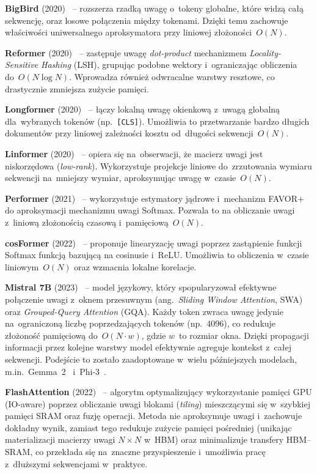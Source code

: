 \documentclass[a4paper,11pt,twoside]{report}
\theoremstyle{definition}
\begin{document}
\textbf{BigBird} (2020)~\cite{zaheer2020big} -- rozszerza rzadką uwagę o~tokeny globalne, które widzą całą sekwencję, oraz losowe połączenia między tokenami. Dzięki temu zachowuje właściwości uniwersalnego aproksymatora przy liniowej złożoności~$O(N)$.

\textbf{Reformer} (2020)~\cite{Kitaev2020Reformer:} -- zastępuje uwagę \textit{dot-product} mechanizmem \textit{Locality-Sensitive Hashing} (LSH), grupując podobne wektory i~ograniczając obliczenia do~$O(N \log N)$. Wprowadza również odwracalne warstwy resztowe, co drastycznie zmniejsza zużycie pamięci.

\textbf{Longformer} (2020)~\cite{beltagy2020longformer} -- łączy lokalną uwagę okienkową z~uwagą globalną dla~wybranych tokenów (np.\ \texttt{[CLS]}). Umożliwia to przetwarzanie bardzo długich dokumentów przy liniowej zależności kosztu od~długości sekwencji~$O(N)$.

\textbf{Linformer} (2020)~\cite{wang2020linformer} -- opiera się na~obserwacji, że macierz uwagi jest niskorzędowa (\textit{low-rank}). Wykorzystuje projekcje liniowe do~zrzutowania wymiaru sekwencji na~mniejszy wymiar, aproksymując uwagę w~czasie~$O(N)$.

\textbf{Performer} (2021)~\cite{choromanski2021rethinking} -- wykorzystuje estymatory jądrowe i~mechanizm FAVOR+ do aproksymacji mechanizmu uwagi Softmax. Pozwala to na obliczanie uwagi z~liniową złożonością czasową i~pamięciową~$O(N)$.

\textbf{cosFormer} (2022)~\cite{qin2022cosformer} -- proponuje linearyzację uwagi poprzez zastąpienie funkcji Softmax funkcją bazującą na cosinusie i~ReLU. Umożliwia to obliczenia w~czasie liniowym~$O(N)$ oraz wzmacnia lokalne korelacje.

\textbf{Mistral 7B} (2023)~\cite{jiang2023mistral} -- model językowy, który spopularyzował efektywne połączenie uwagi z~oknem przesuwnym (ang.\ \emph{Sliding Window Attention}, SWA) oraz \emph{Grouped-Query Attention} (GQA). Każdy token zwraca uwagę jedynie na~ograniczoną liczbę poprzedzających tokenów (np.\ 4096), co redukuje złożoność pamięciową do~$O(N \cdot w)$, gdzie $w$~to rozmiar okna. Dzięki propagacji informacji przez kolejne warstwy model efektywnie agreguje kontekst z~całej sekwencji. Podejście to zostało zaadoptowane w~wielu późniejszych modelach, m.in.\ Gemma~2~\cite{gemmateam2024gemma2} i~Phi-3~\cite{abdin2024phi3}.

\textbf{FlashAttention} (2022)~\cite{dao2022flashattention} -- algorytm optymalizujący wykorzystanie pamięci GPU (IO-aware) poprzez obliczanie uwagi blokami (\textit{tiling}) mieszczącymi się w~szybkiej pamięci SRAM oraz fuzję operacji. Metoda nie aproksymuje uwagi i~zachowuje dokładny wynik, zamiast tego redukuje zużycie pamięci pośredniej (unikając materializacji macierzy uwagi $N \times N$ w~HBM) oraz minimalizuje transfery HBM--SRAM, co przekłada się na~znaczne przyspieszenie i~umożliwia pracę z~dłuższymi sekwencjami w~praktyce.
\end{document}
